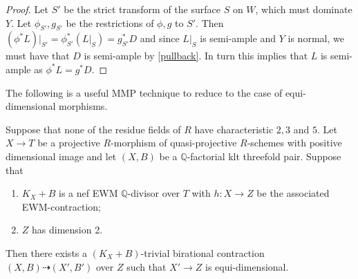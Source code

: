 \begin{proof}
	Let $S'$ be the strict transform of the surface $S$ on $W$, which must dominate $Y$. Let $\phi_{S'}, g_{S'}$ be the restrictions of $\phi, g$ to $S'$. Then $(\phi^{*}L)|_{S'}=\phi_{S'}^{*}(L|_{S})=g_{S'}^{*}D$ and since $L|_{S}$ is semi-ample and $Y$ is normal, we must have that $D$ is semi-ample by \autoref{pullback}. In turn this implies that $L$ is semi-ample as $\phi^{*}L=g^{*}D$.	
\end{proof}	

The following is a useful MMP technique to reduce to the case of equi-dimensional morphisms.

\begin{proposition}\label{three}
	Suppose that none of the residue fields of $R$ have characteristic $2,3$ and $5$. 
	Let $X \to T$ be a projective $R$-morphism of quasi-projective $R$-schemes with positive dimensional image and let $(X,B)$ be a $\mathbb{Q}$-factorial klt threefold pair.
	Suppose that
	\begin{enumerate}
		\item $K_X+B$ is a nef EWM $\mathbb{Q}$-divisor over $T$ with  $h \colon X \to Z$ be the associated EWM-contraction;
		\item $Z$ has dimension 2.
	\end{enumerate}
	
	Then there exists a $(K_X+B)$-trivial birational contraction $(X,B) \dashrightarrow (X', B')$ over $Z$ such that $X' \to Z$ is equi-dimensional. 
\end{proposition}

